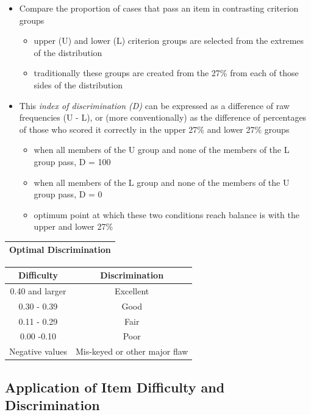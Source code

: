 \documentclass[
  english,
]{book}
\providecommand{\tightlist}{%
  \setlength{\itemsep}{0pt}\setlength{\parskip}{0pt}}
\begin{document}
\begin{itemize}
\tightlist
\item
  Compare the proportion of cases that pass an item in contrasting criterion groups

  \begin{itemize}
  \tightlist
  \item
    upper (U) and lower (L) criterion groups are selected from the extremes of the distribution
  \item
    traditionally these groups are created from the 27\% from each of those sides of the distribution
  \end{itemize}
\item
  This \emph{index of discrimination (D)} can be expressed as a difference of raw frequencies (U - L), or (more conventionally) as the difference of percentages of those who scored it correctly in the upper 27\% and lower 27\% groups

  \begin{itemize}
  \tightlist
  \item
    when all members of the U group and none of the members of the L group pass, D = 100
  \item
    when all members of the L group and none of the members of the U group pass, D = 0
  \item
    optimum point at which these two conditions reach balance is with the upper and lower 27\%
  \end{itemize}
\end{itemize}

\begin{longtable}[]{@{}l@{}}
\toprule
Optimal Discrimination \\
\midrule
\endhead
\bottomrule
\end{longtable}

\begin{longtable}[]{@{}cc@{}}
\toprule
Difficulty & Discrimination \\
\midrule
\endhead
0.40 and larger & Excellent \\
0.30 - 0.39 & Good \\
0.11 - 0.29 & Fair \\
0.00 -0.10 & Poor \\
Negative values & Mis-keyed or other major flaw \\
\bottomrule
\end{longtable}

\hypertarget{application-of-item-difficulty-and-discrimination}{%
\subsection{Application of Item Difficulty and Discrimination}\label{application-of-item-difficulty-and-discrimination}}
\end{document}
